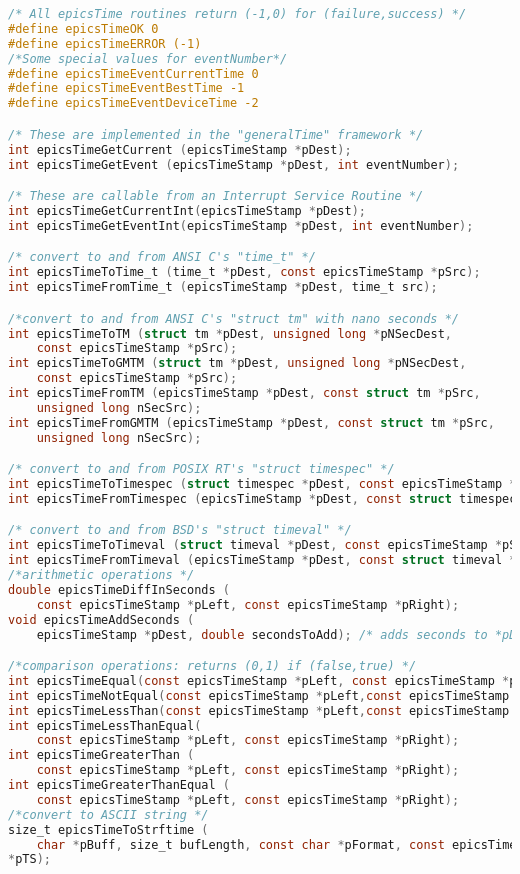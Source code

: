 \begin{lstlisting}[language=C]
/* All epicsTime routines return (-1,0) for (failure,success) */
#define epicsTimeOK 0
#define epicsTimeERROR (-1)
/*Some special values for eventNumber*/
#define epicsTimeEventCurrentTime 0
#define epicsTimeEventBestTime -1
#define epicsTimeEventDeviceTime -2

/* These are implemented in the "generalTime" framework */
int epicsTimeGetCurrent (epicsTimeStamp *pDest);
int epicsTimeGetEvent (epicsTimeStamp *pDest, int eventNumber);

/* These are callable from an Interrupt Service Routine */
int epicsTimeGetCurrentInt(epicsTimeStamp *pDest);
int epicsTimeGetEventInt(epicsTimeStamp *pDest, int eventNumber);

/* convert to and from ANSI C's "time_t" */
int epicsTimeToTime_t (time_t *pDest, const epicsTimeStamp *pSrc);
int epicsTimeFromTime_t (epicsTimeStamp *pDest, time_t src);

/*convert to and from ANSI C's "struct tm" with nano seconds */
int epicsTimeToTM (struct tm *pDest, unsigned long *pNSecDest,
    const epicsTimeStamp *pSrc);
int epicsTimeToGMTM (struct tm *pDest, unsigned long *pNSecDest,
    const epicsTimeStamp *pSrc);
int epicsTimeFromTM (epicsTimeStamp *pDest, const struct tm *pSrc,
    unsigned long nSecSrc);
int epicsTimeFromGMTM (epicsTimeStamp *pDest, const struct tm *pSrc,
    unsigned long nSecSrc);

/* convert to and from POSIX RT's "struct timespec" */
int epicsTimeToTimespec (struct timespec *pDest, const epicsTimeStamp *pSrc);
int epicsTimeFromTimespec (epicsTimeStamp *pDest, const struct timespec *pSrc);

/* convert to and from BSD's "struct timeval" */
int epicsTimeToTimeval (struct timeval *pDest, const epicsTimeStamp *pSrc);
int epicsTimeFromTimeval (epicsTimeStamp *pDest, const struct timeval *pSrc);
/*arithmetic operations */
double epicsTimeDiffInSeconds (
    const epicsTimeStamp *pLeft, const epicsTimeStamp *pRight);
void epicsTimeAddSeconds (
    epicsTimeStamp *pDest, double secondsToAdd); /* adds seconds to *pDest */

/*comparison operations: returns (0,1) if (false,true) */
int epicsTimeEqual(const epicsTimeStamp *pLeft, const epicsTimeStamp *pRight);
int epicsTimeNotEqual(const epicsTimeStamp *pLeft,const epicsTimeStamp *pRight);
int epicsTimeLessThan(const epicsTimeStamp *pLeft,const epicsTimeStamp *pRight);
int epicsTimeLessThanEqual(
    const epicsTimeStamp *pLeft, const epicsTimeStamp *pRight);
int epicsTimeGreaterThan (
    const epicsTimeStamp *pLeft, const epicsTimeStamp *pRight);
int epicsTimeGreaterThanEqual (
    const epicsTimeStamp *pLeft, const epicsTimeStamp *pRight);
/*convert to ASCII string */
size_t epicsTimeToStrftime (
    char *pBuff, size_t bufLength, const char *pFormat, const epicsTimeStamp 
*pTS);


\end{lstlisting}
